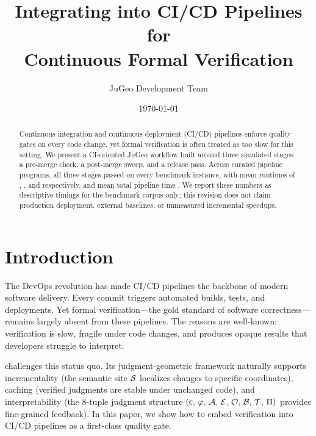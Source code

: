 \documentclass[11pt]{article}
\title{Integrating \JuGeo{} into CI/CD Pipelines for\\Continuous Formal Verification}
\author{JuGeo Development Team}
\date{\today}
\begin{document}
\maketitle

\begin{abstract}
Continuous integration and continuous deployment (CI/CD) pipelines enforce
quality gates on every code change, yet formal verification is often treated
as too slow for this setting. We present a CI-oriented JuGeo workflow built
around three simulated stages: a pre-merge check, a post-merge sweep, and a
release pass. Across \ppLXVprogramCount{} curated pipeline programs, all three
stages passed on every benchmark instance, with mean runtimes of
\ppLXVpreMean{}, \ppLXVpostMean{}, and \ppLXVreleaseMean{} respectively, and
mean total pipeline time \ppLXVtotalMean{}. We report these numbers as
descriptive timings for the benchmark corpus only; this revision does not
claim production deployment, external baselines, or unmeasured incremental
speedups.
\end{abstract}

\section{Introduction}\label{sec:intro}

The DevOps revolution has made CI/CD pipelines the backbone of modern software
delivery. Every commit triggers automated builds, tests, and deployments.
Yet formal verification---the gold standard of software correctness---remains
largely absent from these pipelines. The reasons are well-known: verification
is slow, fragile under code changes, and produces opaque results that developers
struggle to interpret.

\JuGeo{} challenges this status quo. Its judgment-geometric framework naturally
supports incrementality (the semantic site $\mathcal{S}$ localizes changes to
specific coordinates), caching (verified judgments are stable under unchanged
code), and interpretability (the 8-tuple judgment structure
$(\mathsf{c},\,\varphi,\,\mathcal{A},\,\mathcal{E},\,\mathcal{O},\,\mathcal{B},\,\mathcal{T},\,\Pi)$
provides fine-grained feedback). In this paper, we show how to embed \JuGeo{}
verification into CI/CD pipelines as a first-class quality gate.
\end{document}
